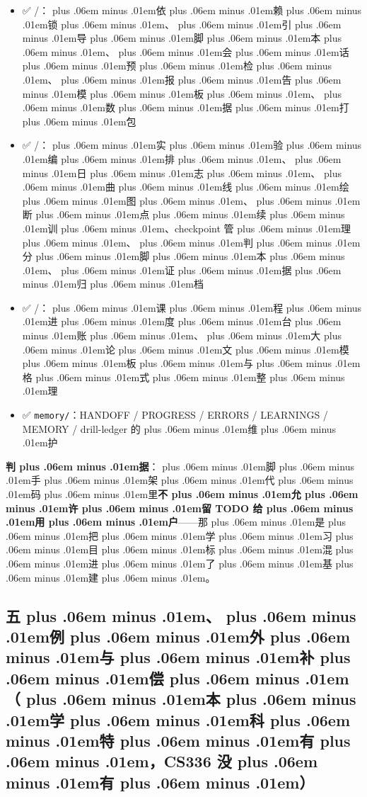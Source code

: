 \documentclass[
]{article}
\newcommand{\passthrough}[1]{#1}
\providecommand{\tightlist}{%
  \setlength{\itemsep}{0pt}\setlength{\parskip}{0pt}}
\def\zh#1{{\zhfont #1}}
\def\emo#1{{\emofont #1}}
\def\codezh#1{{\zhmonofont #1}}
\def\zhglue{\hskip0pt plus .06em minus .01em}
\begin{document}
\begin{itemize}
\tightlist
\item
  \emo{✅} \passthrough{\codezh{{\zh{环}}{\zh{境}}/}}\zh{：\zhglue 依\zhglue 赖\zhglue 锁\zhglue 、\zhglue 引\zhglue 导\zhglue 脚\zhglue 本\zhglue 、\zhglue 会\zhglue 话\zhglue 预\zhglue 检\zhglue 、\zhglue 报\zhglue 告\zhglue 模\zhglue 板\zhglue 、\zhglue 数\zhglue 据\zhglue 打\zhglue 包}
\item
  \emo{✅} \passthrough{\codezh{{\zh{脚}}{\zh{手}}{\zh{架}}/}}\zh{：\zhglue 实\zhglue 验\zhglue 编\zhglue 排\zhglue 、\zhglue 日\zhglue 志\zhglue 、\zhglue 曲\zhglue 线\zhglue 绘\zhglue 图\zhglue 、\zhglue 断\zhglue 点\zhglue 续\zhglue 训\zhglue 、}checkpoint \zh{管\zhglue 理\zhglue 、\zhglue 判\zhglue 分\zhglue 脚\zhglue 本\zhglue 、\zhglue 证\zhglue 据\zhglue 归\zhglue 档}
\item
  \emo{✅} \passthrough{\codezh{{\zh{课}}{\zh{程}}{\zh{轨}}/}}\zh{：\zhglue 课\zhglue 程\zhglue 进\zhglue 度\zhglue 台\zhglue 账\zhglue 、\zhglue 大\zhglue 论\zhglue 文\zhglue 模\zhglue 板\zhglue 与\zhglue 格\zhglue 式\zhglue 整\zhglue 理}
\item
  \emo{✅} \passthrough{\lstinline!memory/!}\zh{：}HANDOFF / PROGRESS / ERRORS / LEARNINGS / MEMORY / drill-ledger \zh{的\zhglue 维\zhglue 护}
\end{itemize}

\textbf{\zh{判\zhglue 据}}\zh{：\zhglue 脚\zhglue 手\zhglue 架\zhglue 代\zhglue 码\zhglue 里}\textbf{\zh{不\zhglue 允\zhglue 许\zhglue 留} TODO \zh{给\zhglue 用\zhglue 户}}------\zh{那\zhglue 是\zhglue 把\zhglue 学\zhglue 习\zhglue 目\zhglue 标\zhglue 混\zhglue 进\zhglue 了\zhglue 基\zhglue 建\zhglue 。}

\subsection{\zh{五\zhglue 、\zhglue 例\zhglue 外\zhglue 与\zhglue 补\zhglue 偿\zhglue （\zhglue 本\zhglue 学\zhglue 科\zhglue 特\zhglue 有\zhglue ，}CS336 \zh{没\zhglue 有\zhglue ）}}\label{ux4e94ux4f8bux5916ux4e0eux8865ux507fux672cux5b66ux79d1ux7279ux6709cs336-ux6ca1ux6709}
\end{document}
